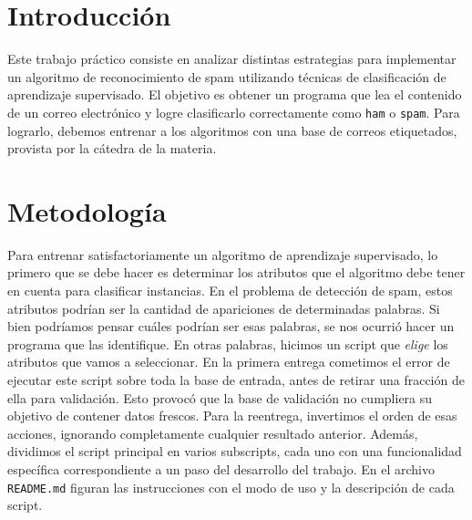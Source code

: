 \documentclass[10pt, a4paper]{article}
\begin{document}
\fecha{\today}

\maketitle
\tableofcontents
\newpage

\section{Introducción}

Este trabajo práctico consiste en analizar distintas estrategias para implementar un algoritmo de reconocimiento de spam utilizando técnicas de clasificación de aprendizaje supervisado. El objetivo es obtener un programa que lea el contenido de un correo electrónico y logre clasificarlo correctamente como \texttt{ham} o \texttt{spam}. Para lograrlo, debemos entrenar a los algoritmos con una base de correos etiquetados, provista por la cátedra de la materia.

\section{Metodología}

Para entrenar satisfactoriamente un algoritmo de aprendizaje supervisado, lo primero que se debe hacer es determinar los atributos que el algoritmo debe tener en cuenta para clasificar instancias. En el problema de detección de spam, estos atributos podrían ser la cantidad de apariciones de determinadas palabras. Si bien podríamos pensar cuáles podrían ser esas palabras, se nos ocurrió hacer un programa que las identifique. En otras palabras, hicimos un script que \textit{elige} los atributos que vamos a seleccionar. En la primera entrega cometimos el error de ejecutar este script sobre toda la base de entrada, antes de retirar una fracción de ella para validación. Esto provocó que la base de validación no cumpliera su objetivo de contener datos frescos.
Para la reentrega, invertimos el orden de esas acciones, ignorando completamente cualquier resultado anterior. Además, dividimos el script principal en varios subscripts, cada uno con una funcionalidad específica correspondiente a un paso del desarrollo del trabajo. En el archivo \texttt{README.md} figuran las instrucciones con el modo de uso y la descripción de cada script.
\end{document}
